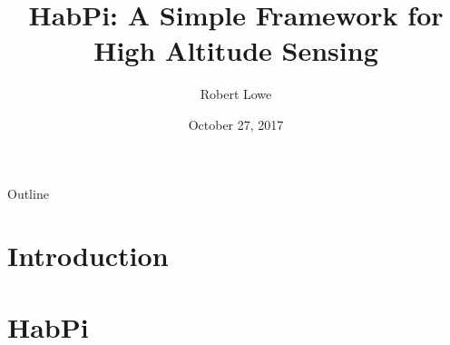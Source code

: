 \documentclass{beamer}
\title{HabPi: A Simple Framework for High Altitude Sensing}
\author{Robert Lowe\\}
\institute[Maryville College] %
{
  Division of Mathematics and Computer Science\\
  Maryville College
}
\date[]{October 27, 2017}
\begin{document}
\begin{frame}
  \titlepage
\end{frame}

\begin{frame}{Outline}
  \tableofcontents
\end{frame}




\section{Introduction}

\section{HabPi}
\end{document}
